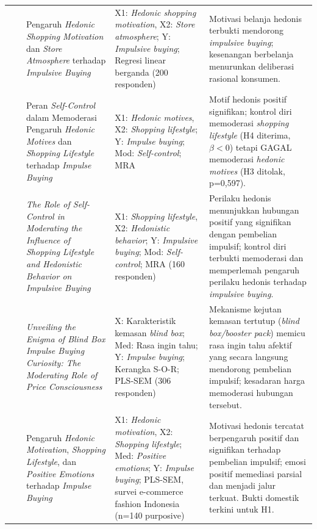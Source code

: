 \documentclass[12pt,a4paper]{article}
\numberwithin{equation}{section}
\numberwithin{table}{section}
\numberwithin{figure}{section}
\begin{document}
\begin{longtable}{>{\centering\arraybackslash}p{0.5cm} >{\raggedright\arraybackslash}p{2.3cm} >{\raggedright\arraybackslash}p{3.2cm} >{\raggedright\arraybackslash}p{2.6cm} >{\raggedright\arraybackslash}p{3.9cm}}
1 & \citet{pranggabayu2022pengaruh} & Pengaruh \emph{Hedonic Shopping Motivation} dan \emph{Store Atmosphere} terhadap \emph{Impulsive Buying} & X1: \emph{Hedonic shopping motivation}, X2: \emph{Store atmosphere}; Y: \emph{Impulsive buying}; Regresi linear berganda (200 responden) & Motivasi belanja hedonis terbukti mendorong \emph{impulsive buying}; kesenangan berbelanja menurunkan deliberasi rasional konsumen. \\
\addlinespace[4pt]
2 & \citet{apidana2022peran} & Peran \emph{Self-Control} dalam Memoderasi Pengaruh \emph{Hedonic Motives} dan \emph{Shopping Lifestyle} terhadap \emph{Impulse Buying} & X1: \emph{Hedonic motives}, X2: \emph{Shopping lifestyle}; Y: \emph{Impulse buying}; Mod: \emph{Self-control}; MRA & Motif hedonis positif signifikan; kontrol diri memoderasi \emph{shopping lifestyle} (H4 diterima, $\beta<0$) tetapi GAGAL memoderasi \emph{hedonic motives} (H3 ditolak, p=0,597). \\
\addlinespace[4pt]
3 & \citet{lienardy2026role} & \emph{The Role of Self-Control in Moderating the Influence of Shopping Lifestyle and Hedonistic Behavior on Impulsive Buying} & X1: \emph{Shopping lifestyle}, X2: \emph{Hedonistic behavior}; Y: \emph{Impulsive buying}; Mod: \emph{Self-control}; MRA (160 responden) & Perilaku hedonis menunjukkan hubungan positif yang signifikan dengan pembelian impulsif; kontrol diri terbukti memoderasi dan memperlemah pengaruh perilaku hedonis terhadap \emph{impulsive buying}. \\
\addlinespace[4pt]
4 & \citet{gong2024unveiling} & \emph{Unveiling the Enigma of Blind Box Impulse Buying Curiosity: The Moderating Role of Price Consciousness} & X: Karakteristik kemasan \emph{blind box}; Med: Rasa ingin tahu; Y: \emph{Impulse buying}; Kerangka S-O-R; PLS-SEM (306 responden) & Mekanisme kejutan kemasan tertutup (\emph{blind box/booster pack}) memicu rasa ingin tahu afektif yang secara langsung mendorong pembelian impulsif; kesadaran harga memoderasi hubungan tersebut. \\
\addlinespace[4pt]
5 & \citet{azizah2025exploring} & Pengaruh \emph{Hedonic Motivation}, \emph{Shopping Lifestyle}, dan \emph{Positive Emotions} terhadap \emph{Impulse Buying} & X1: \emph{Hedonic motivation}, X2: \emph{Shopping lifestyle}; Med: \emph{Positive emotions}; Y: \emph{Impulse buying}; PLS-SEM, survei e-commerce fashion Indonesia (n=140 purposive) & Motivasi hedonis tercatat berpengaruh positif dan signifikan terhadap pembelian impulsif; emosi positif memediasi parsial dan menjadi jalur terkuat. Bukti domestik terkini untuk H1. \\

\end{longtable}
\end{document}
